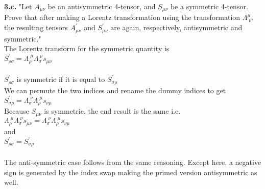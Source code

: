 \documentclass[prb,preprint]
{revtex4-1}
\begin{document}
\bigskip
{\bf 3.c.}  "Let $A_{\mu\nu}$ be an antisymmetric 4-tensor, and $S_{\mu\nu}$ be a symmetric 4-tensor. Prove that after making a Lorentz transformation using the transformation $\Lambda^\mu_{\;\nu}$, the resulting tensors $A^\prime_{\mu\nu}$ and $S^\prime_{\mu\nu}$ are again, respectively, antisymmetric and symmetric."
\\
The Lorentz transform for the symmetric quantity is 
\\
$S^\prime_{\rho\sigma} = \Lambda_\rho^{\;\mu}\Lambda_\sigma^{\;\nu}s_{\mu\nu}$
\\
\\
$S^\prime_{\rho\sigma}$ is symmetric if it is equal to $S^\prime_{\sigma\rho}$
\\
We can permute the two indices and rename the dummy indices to get
\\
$S^\prime_{\sigma\rho} = \Lambda_\sigma^{\;\nu}\Lambda_\rho^{\;\mu}s_{\nu\mu}$
\\
Because $S_{\mu\nu}$ is symmetric, the end result is the same i.e.
\\
$\Lambda_\rho^{\;\mu}\Lambda_\sigma^{\;\nu}s_{\mu\nu} = \Lambda_\sigma^{\;\nu}\Lambda_\rho^{\;\mu}s_{\nu\mu}$
\\
and
\\
$S^\prime_{\rho\sigma} = S^\prime_{\sigma\rho}$
\\
\\
The anti-symmetric case follows from the same reasoning.  Except here, a negative sign is generated by the index swap making the primed version antisymmetric as well.
\\






\end{document}
